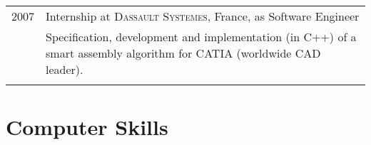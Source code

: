 \documentclass[a4paper,10pt]{article} %
\begin{document}
\begin{tabular}{r|p{11.5cm}}

\textsc{2007} &
Internship at \textsc{Dassault Systemes}, France, as Software Engineer \\
& \footnotesize{Specification, development and implementation (in C++) of a
  smart assembly algorithm for CATIA (worldwide CAD leader).} \\
\multicolumn{2}{c}{} \\






\end{tabular}


\section{Computer Skills}
\end{document}
